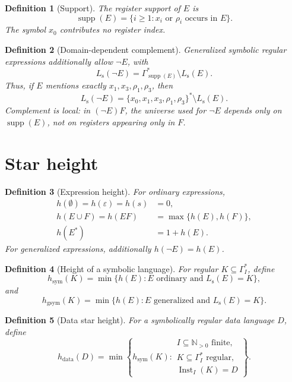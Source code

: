 \documentclass[11pt]{article}
\newtheorem{definition}{Definition}
\begin{document}
\begin{definition}[Support]
The register support of $E$ is
\[
 \operatorname{supp}(E)=
 \{i\geq1:x_i\text{ or }\rho_i\text{ occurs in }E\}.
\]
The symbol $x_0$ contributes no register index.
\end{definition}

\begin{definition}[Domain-dependent complement]
Generalized symbolic regular expressions additionally allow $\neg E$, with
\[
 L_{\mathrm s}(\neg E)=
 \Gamma_{\operatorname{supp}(E)}^*\setminus L_{\mathrm s}(E).
\]
Thus, if $E$ mentions exactly $x_1,x_3,\rho_1,\rho_3$, then
\[
 L_{\mathrm s}(\neg E)=
 \bigl\{x_0,x_1,x_3,\rho_1,\rho_3\bigr\}^*\setminus L_{\mathrm s}(E).
\]
Complement is local: in $(\neg E)F$, the universe used for $\neg E$ depends
only on $\operatorname{supp}(E)$, not on registers appearing only in $F$.
\end{definition}

\section{Star height}

\begin{definition}[Expression height]
For ordinary expressions,
\[
\begin{aligned}
h(\emptyset)=h(\varepsilon)=h(s)&=0,\\
h(E\cup F)=h(EF)&=\max\{h(E),h(F)\},\\
h(E^*)&=1+h(E).
\end{aligned}
\]
For generalized expressions, additionally $h(\neg E)=h(E)$.
\end{definition}

\begin{definition}[Height of a symbolic language]
For regular $K\subseteq\Gamma_I^*$, define
\[
 h_{\mathrm{sym}}(K)=
 \min\{h(E):E\text{ ordinary and }L_{\mathrm s}(E)=K\},
\]
and
\[
 h_{\mathrm{gsym}}(K)=
 \min\{h(E):E\text{ generalized and }L_{\mathrm s}(E)=K\}.
\]
\end{definition}

\begin{definition}[Data star height]
For a symbolically regular data language $D$, define
\[
 h_{\mathrm{data}}(D)=
 \min\left\{
 h_{\mathrm{sym}}(K):
 \begin{array}{l}
 I\subseteq\mathbb N_{>0}\text{ finite},\\
 K\subseteq\Gamma_I^*\text{ regular},\\
 \operatorname{Inst}_I(K)=D
 \end{array}
 \right\}.
\]
\end{definition}
\end{document}
